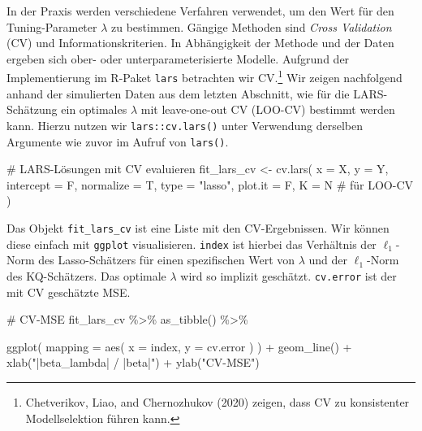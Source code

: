 \documentclass[
  a4paper,
  DIV=11,
  oneside]{scrreprt}
\newenvironment{Shaded}{\begin{snugshade}}{\end{snugshade}}
\newcommand{\AttributeTok}[1]{\textcolor[rgb]{0.40,0.45,0.13}{#1}}
\newcommand{\CommentTok}[1]{\textcolor[rgb]{0.37,0.37,0.37}{#1}}
\newcommand{\FunctionTok}[1]{\textcolor[rgb]{0.28,0.35,0.67}{#1}}
\newcommand{\NormalTok}[1]{\textcolor[rgb]{0.00,0.23,0.31}{#1}}
\newcommand{\OtherTok}[1]{\textcolor[rgb]{0.00,0.23,0.31}{#1}}
\newcommand{\SpecialCharTok}[1]{\textcolor[rgb]{0.37,0.37,0.37}{#1}}
\newcommand{\StringTok}[1]{\textcolor[rgb]{0.13,0.47,0.30}{#1}}
\begin{document}
In der Praxis werden verschiedene Verfahren verwendet, um den Wert für
den Tuning-Parameter \(\lambda\) zu bestimmen. Gängige Methoden sind
\emph{Cross Validation} (CV) und Informationskriterien. In Abhängigkeit
der Methode und der Daten ergeben sich ober- oder unterparameterisierte
Modelle. Aufgrund der Implementierung im R-Paket \texttt{lars}
betrachten wir CV.\footnote{Chetverikov, Liao, and Chernozhukov (2020)
  zeigen, dass CV zu konsistenter Modellselektion führen kann.} Wir
zeigen nachfolgend anhand der simulierten Daten aus dem letzten
Abschnitt, wie für die LARS-Schätzung ein optimales \(\lambda\) mit
leave-one-out CV (LOO-CV) bestimmt werden kann. Hierzu nutzen wir
\texttt{lars::cv.lars()} unter Verwendung derselben Argumente wie zuvor
im Aufruf von \texttt{lars()}.

\begin{Shaded}
\begin{Highlighting}[]
\CommentTok{\# LARS{-}Lösungen mit CV evaluieren}
\NormalTok{fit\_lars\_cv }\OtherTok{\textless{}{-}} \FunctionTok{cv.lars}\NormalTok{(}
  \AttributeTok{x =}\NormalTok{ X, }
  \AttributeTok{y =}\NormalTok{ Y, }
  \AttributeTok{intercept =}\NormalTok{ F,}
  \AttributeTok{normalize =}\NormalTok{ T,}
  \AttributeTok{type =} \StringTok{"lasso"}\NormalTok{, }
  \AttributeTok{plot.it =}\NormalTok{ F, }
  \AttributeTok{K =}\NormalTok{ N }\CommentTok{\# für LOO{-}CV}
\NormalTok{) }
\end{Highlighting}
\end{Shaded}

Das Objekt \texttt{fit\_lars\_cv} ist eine Liste mit den CV-Ergebnissen.
Wir können diese einfach mit \texttt{ggplot} visualisieren.
\texttt{index} ist hierbei das Verhältnis der \(\ell_1\)-Norm des
Lasso-Schätzers für einen spezifischen Wert von \(\lambda\) und der
\(\ell_1\)-Norm des KQ-Schätzers. Das optimale \(\lambda\) wird so
implizit geschätzt. \texttt{cv.error} ist der mit CV geschätzte MSE.

\begin{Shaded}
\begin{Highlighting}[]
\CommentTok{\# CV{-}MSE}
\NormalTok{fit\_lars\_cv }\SpecialCharTok{\%\textgreater{}\%} 
  \FunctionTok{as\_tibble}\NormalTok{() }\SpecialCharTok{\%\textgreater{}\%}

  \FunctionTok{ggplot}\NormalTok{(}
    \AttributeTok{mapping =} \FunctionTok{aes}\NormalTok{(}
      \AttributeTok{x =}\NormalTok{ index, }
      \AttributeTok{y =}\NormalTok{ cv.error}
\NormalTok{    )}
\NormalTok{  ) }\SpecialCharTok{+} 
  \FunctionTok{geom\_line}\NormalTok{() }\SpecialCharTok{+}
  \FunctionTok{xlab}\NormalTok{(}\StringTok{"|beta\_lambda| / |beta|"}\NormalTok{) }\SpecialCharTok{+}
  \FunctionTok{ylab}\NormalTok{(}\StringTok{"CV{-}MSE"}\NormalTok{)}
\end{Highlighting}
\end{Shaded}
\end{document}
